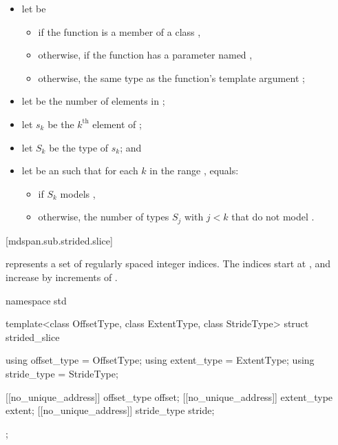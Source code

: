 \begin{itemize}
\item let  be
  \begin{itemize}
  \item
  if the function is a member of a class ,
  \item
  otherwise,
  if the function has a parameter named ,
  \item
  otherwise,
  the same type as the function's template argument ;
  \end{itemize}
\item let  be the number of elements in ;
\item let $s_k$ be the $k^\text{th}$ element of ;
\item let $S_k$ be the type of $s_k$; and
\item let  be an  such that
for each $k$ in the range ,
 equals:
  \begin{itemize}
  \item
  if $S_k$ models ,
  \item
  otherwise,
  the number of types $S_j$ with $j < k$ that
  do not model .
  \end{itemize}
\end{itemize}

[mdspan.sub.strided.slice]{}

\pnum
{} represents a set of
 regularly spaced integer indices.
The indices start at , and
increase by increments of .

%
\begin{codeblock}
namespace std {
  template<class OffsetType, class ExtentType, class StrideType>
  struct strided_slice {
    using offset_type = OffsetType;
    using extent_type = ExtentType;
    using stride_type = StrideType;

    [[no_unique_address]] offset_type offset{};
    [[no_unique_address]] extent_type extent{};
    [[no_unique_address]] stride_type stride{};
  };
}
\end{codeblock}

